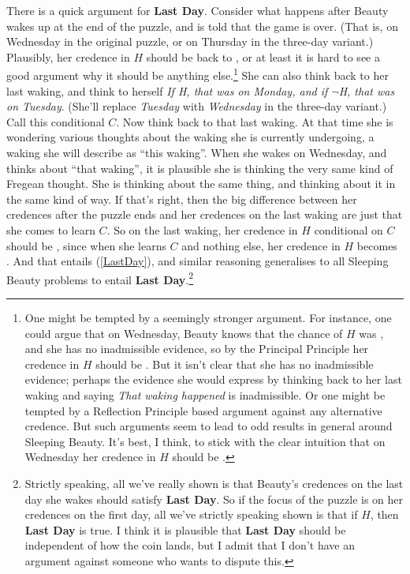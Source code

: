 There is a quick argument for \textbf{Last Day}. Consider what happens after Beauty wakes up at the end of the puzzle, and is told that the game is over. (That is, on Wednesday in the original puzzle, or on Thursday in the three-day variant.) Plausibly, her credence in $H$ should be back to \half, or at least it is hard to see a good argument why it should be anything else.\footnote{One might be tempted by a seemingly stronger argument. For instance, one could argue that on Wednesday, Beauty knows that the chance of $H$ was \half, and she has no inadmissible evidence, so by the Principal Principle her credence in $H$ should be \half. But it isn't clear that she has no inadmissible evidence; perhaps the evidence she would express by thinking back to her last waking and saying \textit{That waking happened} is inadmissible. Or one might be tempted by a Reflection Principle based argument against any alternative credence. But such arguments seem to lead to odd results in general around Sleeping Beauty. It's best, I think, to stick with the clear intuition that on Wednesday her credence in $H$ should be \half.} She can also think back to her last waking, and think to herself \textit{If H, that was on Monday, and if $\neg$H, that was on Tuesday}. (She'll replace \textit{Tuesday} with \textit{Wednesday} in the three-day variant.) Call this conditional $C$. Now think back to that last waking. At that time she is wondering various thoughts about the waking she is currently undergoing, a waking she will describe as ``this waking''. When she wakes on Wednesday, and thinks about ``that waking'', it is plausible she is thinking the very same kind of Fregean thought. She is thinking about the same thing, and thinking about it in the same kind of way. If that's right, then the big difference between her credences after the puzzle ends and her credences on the last waking are just that she comes to learn $C$. So on the last waking, her credence in $H$ conditional on $C$ should be \half, since when she learns $C$ and nothing else, her credence in $H$ becomes \half. And that entails (\ref{LastDay}), and similar reasoning generalises to all Sleeping Beauty problems to entail \textbf{Last Day}.\footnote{Strictly speaking, all we've really shown is that Beauty's credences on the last day she wakes should satisfy \textbf{Last Day}. So if the focus of the puzzle is on her credences on the first day, all we've strictly speaking shown is that if $H$, then \textbf{Last Day} is true. I think it is plausible that \textbf{Last Day} should be independent of how the coin lands, but I admit that I don't have an argument against someone who wants to dispute this.}

